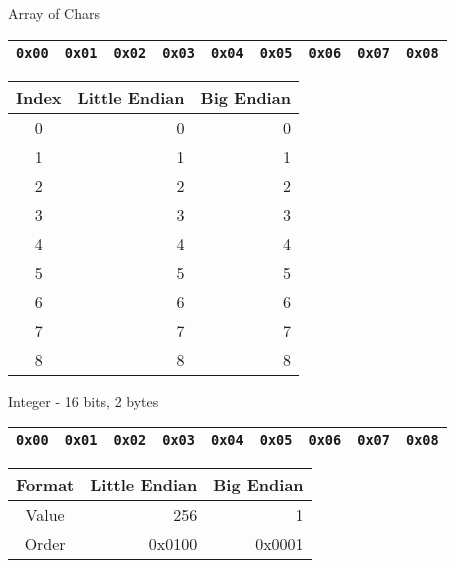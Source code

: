 \documentclass{beamer}
\begin{document}
\begin{frame}{Array of Chars}

\begin{table}[]
\begin{tabular}{|l|l|l|l|l|l|l|l|l|}
\hline
 \color{red}\texttt{0x00} & \color{blue}\texttt{0x01} & \color{green}\texttt{0x02} & \color{red}\texttt{0x03} & \color{blue}\texttt{0x04} & \color{green}\texttt{0x05} & \color{red}\texttt{0x06} & \color{blue}\texttt{0x07} &
 \color{green}\texttt{0x08} \\
\hline 
\end{tabular}
\end{table}

\begin{table}[]
\begin{tabular}{c r r}
Index & Little Endian & Big Endian \\
\hline
0 & 0 & 0 \\
1 & 1 & 1 \\
2 & 2 & 2 \\
3 & 3 & 3 \\
4 & 4 & 4 \\
5 & 5 & 5 \\
6 & 6 & 6 \\
7 & 7 & 7 \\
8 & 8 & 8 \\
\end{tabular}
\end{table}

\end{frame}

\begin{frame}{Integer - 16 bits, 2 bytes}

\begin{table}[]
\begin{tabular}{|l|l|l|l|l|l|l|l|l|}
\hline
 \color{red}\texttt{0x00} & \color{red}\texttt{0x01} & \texttt{0x02} & \texttt{0x03} & \texttt{0x04} & \texttt{0x05} & \texttt{0x06} & \texttt{0x07} &
 \texttt{0x08} \\
\hline 
\end{tabular}
\end{table}

\begin{table}[]
\begin{tabular}{c r r}
Format & Little Endian & Big Endian \\
\hline
Value &  256   & 1 \\
Order & 0x0100 & 0x0001
\end{tabular}
\end{table}

\end{frame}
\end{document}
